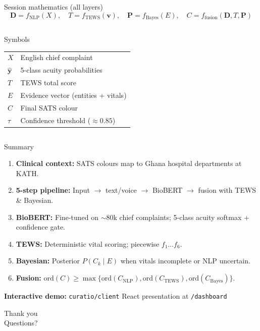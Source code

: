 \documentclass[aspectratio=169,11pt]{beamer}
\begin{document}
\begin{frame}{Session mathematics (all layers)}
  \begin{equation*}
    \mathbf{D} = f_{\mathrm{NLP}}(X),\quad
    T = f_{\mathrm{TEWS}}(\mathbf{v}),\quad
    \mathbf{P} = f_{\mathrm{Bayes}}(E),\quad
    C = f_{\mathrm{fusion}}(\mathbf{D}, T, \mathbf{P})
  \end{equation*}

  \begin{columns}[T]
    \begin{block}{Symbols}
      \footnotesize
      \begin{tabular}{@{}ll@{}}
        $X$ & English chief complaint \\
        $\hat{\mathbf{y}}$ & 5-class acuity probabilities \\
        $T$ & TEWS total score \\
        $E$ & Evidence vector (entities + vitals) \\
        $C$ & Final SATS colour \\
        $\tau$ & Confidence threshold ($\approx 0.85$) \\
      \end{tabular}
    \end{block}

  \end{columns}
\end{frame}









\begin{frame}{Summary}
  \begin{enumerate}
    \item \textbf{Clinical context:} SATS colours map to Ghana hospital departments at KATH.
    \item \textbf{5-step pipeline:} Input $\to$ text/voice $\to$ BioBERT $\to$ fusion with TEWS \& Bayesian.
    \item \textbf{BioBERT:} Fine-tuned on $\sim$80k chief complaints; 5-class acuity softmax + confidence gate.
    \item \textbf{TEWS:} Deterministic vital scoring; piecewise $f_1\ldots f_6$.
    \item \textbf{Bayesian:} Posterior $P(C_k\mid E)$ when vitals incomplete or NLP uncertain.
    \item \textbf{Fusion:} $\mathrm{ord}(C) \geq \max\{\mathrm{ord}(C_{\mathrm{NLP}}), \mathrm{ord}(C_{\mathrm{TEWS}}), \mathrm{ord}(C_{\mathrm{Bayes}})\}$.
  \end{enumerate}

  \vspace{0.5em}
  \centering
  \textbf{Interactive demo:} \texttt{curatio/client} React presentation at \texttt{/dashboard}
\end{frame}

\begin{frame}
  \centering
  \Large Thank you\\
  \vspace{0.8em}
  \normalsize Questions?
\end{frame}
\end{document}
